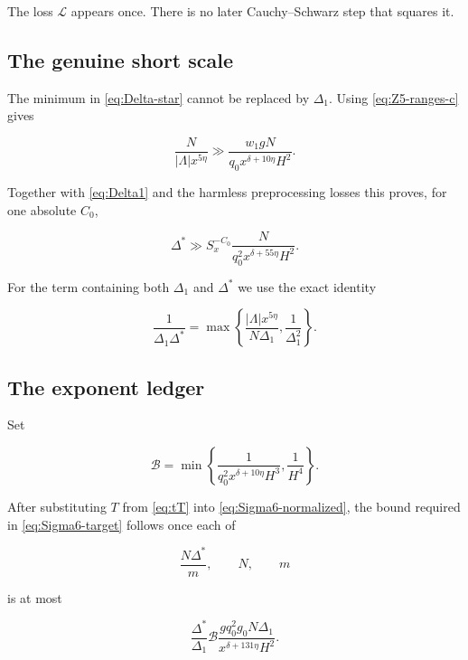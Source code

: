 The loss $\mathcal L$ appears once.  There is no later Cauchy--Schwarz step
that squares it.

\subsection{The genuine short scale}

The minimum in \cref{eq:Delta-star} cannot be replaced by $\Delta_1$.
Using \cref{eq:Z5-ranges-c} gives

\[
 \frac{N}{|\Lambda|x^{5\eta}}
 \gg\frac{w_1gN}{q_0x^{\delta+10\eta}H^2}.
\]

Together with \cref{eq:Delta1} and the harmless preprocessing losses this
proves, for one absolute $C_0$,

\begin{equation}\label{eq:Delta-star-lower}
 \Delta^*\gg S_x^{-C_0}
 \frac{N}{q_0^2x^{\delta+55\eta}H^2}.
\end{equation}

For the term containing both $\Delta_1$ and $\Delta^*$ we use the exact
identity

\begin{equation}\label{eq:Delta-star-branches}
 \frac1{\Delta_1\Delta^*}
 =\max\left\{
 \frac{|\Lambda|x^{5\eta}}{N\Delta_1},
 \frac1{\Delta_1^2}
 \right\}.
\end{equation}

\subsection{The exponent ledger}

Set

\begin{equation}\label{eq:Bfactor}
 \mathcal B=\min\left\{
 \frac1{q_0^2x^{\delta+10\eta}H^3},
 \frac1{H^4}
 \right\}.
\end{equation}

After substituting $T$ from \cref{eq:tT} into
\cref{eq:Sigma6-normalized}, the bound required in
\cref{eq:Sigma6-target} follows once each of

\begin{equation}\label{eq:three-terminal-terms}
 \frac{N\Delta^*}{m},\qquad N,\qquad m
\end{equation}

is at most

\begin{equation}\label{eq:terminal-RHS}
 \frac{\Delta^*}{\Delta_1}\mathcal B
 \frac{gq_0^2g_0N\Delta_1}{x^{\delta+131\eta}H^2}.
\end{equation}

